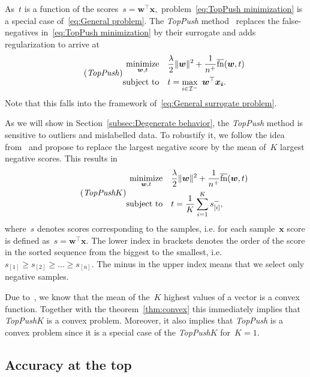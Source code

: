 \documentclass[11pt,a4paper]{article}
\theoremstyle{definition}
\newcommand{\norm}[1]{\|#1\|}
\newcommand{\minimize}{\operatorname*{minimize}}
\newcommand{\st}{\operatorname{subject\ to}}
\newcommand{\I}{\mathcal{I}}
\newcommand{\fns}{\overline{\textnormal{fn}}}
\newcommand{\toppush}{\textit{TopPush}\xspace}
\newcommand{\toppushk}{\textit{TopPush$K$}\xspace}
\begin{document}
As~$t$ is a function of the scores~$s = \bm{w}^\top \bm{x},$ problem~\eqref{eq:TopPush minimization} is a special case of~\eqref{eq:General problem}. The \toppush method~\cite{li2014top} replaces the false-negatives in~\eqref{eq:TopPush minimization} by their surrogate and adds regularization to arrive at
\begin{equation}\label{eq:TopPush}\tag{\toppush}
  \begin{aligned}
    \minimize_{\bm{w}, t} & \quad \frac{\lambda}{2}\norm{\bm{w}}^2 + \frac{1}{n^+}\fns(\bm{w},t) \\
    \st                   & \quad t = \max_{i\in \I^-} \ \bm{w}^\top \bm{x_i}.
  \end{aligned}
\end{equation}
Note that this falls into the framework of~\eqref{eq:General surrogate problem}.

As we will show in Section~\ref{subsec:Degenerate behavior}, the \toppush method is sensitive to outliers and mislabelled data. To robustify it, we follow the idea from~\cite{lapin2015top} and propose to replace the largest negative score by the mean of~$K$ largest negative scores. This results in
\begin{equation}\label{eq:TopPushK}\tag{\toppushk}
  \begin{aligned}
    \minimize_{\bm{w}, t} & \quad \frac{\lambda}{2}\norm{\bm{w}}^2 + \frac{1}{n^+}\fns(\bm{w},t) \\
    \st                   & \quad t = \frac{1}{K} \sum_{i = 1}^{K}  s^{-}_{[i]}, \\
  \end{aligned}
\end{equation}
where~$s$ denotes scores corresponding to the samples, i.e. for each sample~$\bm{x}$ score is defined as~$s = \bm{w}^\top \bm{x}.$ The lower index in brackets denotes the order of the score in the sorted sequence from the biggest to the smallest, i.e.~$s_{[1]} \geq s_{[2]} \geq \ldots  \geq s_{[n]}.$ The minus in the upper index means that we select only negative samples.   

Due to~\cite{lapin2015top}, we know that the mean of the~$K$ highest values of a vector is a convex function. Together with the theorem~\ref{thm:convex} this immediately implies that \toppushk is a convex problem. Moreover, it also implies that \toppush is a convex problem since it is a special case of the \toppushk for~$K=1.$   


\subsection{Accuracy at the top}\label{subsec:Accuracy at the top}
\end{document}
